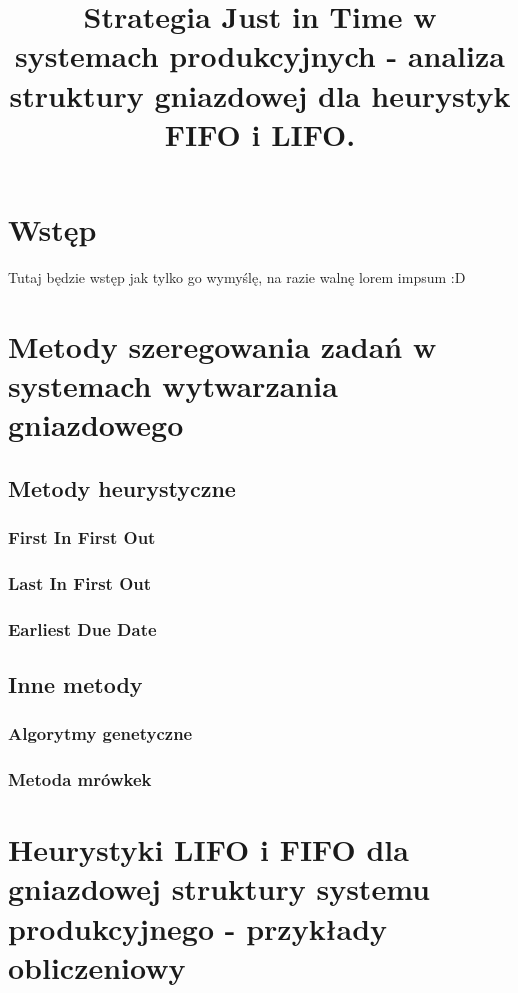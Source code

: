 \documentclass[twoside]{pracaInzynierskaMS}
\title{Strategia Just in Time w systemach produkcyjnych - analiza struktury gniazdowej dla heurystyk\\ FIFO i LIFO.}
\begin{document}
\section        {Wstęp}

Tutaj będzie wstęp \cite{Poz1} jak tylko go wymyślę, na razie walnę lorem impsum :D \\

\section        [Metody szeregowania zadań \ldots]
		        {Metody szeregowania zadań w systemach wytwarzania gniazdowego}

\subsection     {Metody heurystyczne}
\subsubsection  {First In First Out}

\subsubsection  {Last In First Out}

\subsubsection  {Earliest Due Date}



\subsection     {Inne metody}
\subsubsection  {Algorytmy genetyczne}

\subsubsection  {Metoda mrówkek}



\section        [Heurystyki LIFO i FIFO \ldots]
                {Heurystyki LIFO i FIFO \newlineSpis dla gniazdowej \newlineTekst struktury systemu produkcyjnego - przykłady obliczeniowy}
\end{document}
